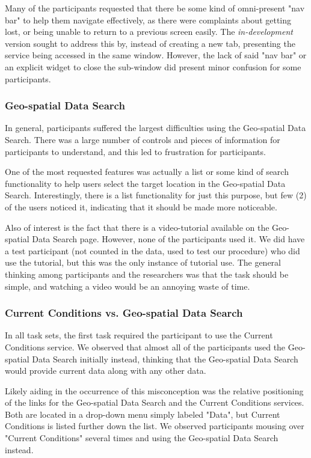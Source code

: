 \documentclass{article}
\begin{document}
Many of the participants requested that there be some kind of omni-present "nav bar" to help them navigate effectively, as there were complaints about getting lost, or being unable to return to a previous screen easily. The \emph{in-development} version sought to address this by, instead of creating a new tab, presenting the service being accessed in the same window. However, the lack of said "nav bar" or an explicit widget to close the sub-window did present minor confusion for some participants.

\subsubsection{Geo-spatial Data Search}
In general, participants suffered the largest difficulties using the Geo-spatial Data Search. There was a large number of controls and pieces of information for participants to understand, and this led to frustration for participants.

One of the most requested features was actually a list or some kind of search functionality to help users select the target location in the Geo-spatial Data Search. Interestingly, there is a list functionality for just this purpose, but few (2) of the users noticed it, indicating that it should be made more noticeable.

Also of interest is the fact that there is a video-tutorial available on the Geo-spatial Data Search page. However, none of the participants used it. We did have a test participant (not counted in the data, used to test our procedure) who did use the tutorial, but this was the only instance of tutorial use. The general thinking among participants and the researchers was that the task should be simple, and watching a video would be an annoying waste of time.

\subsubsection{Current Conditions vs. Geo-spatial Data Search}
In all task sets, the first task required the participant to use the Current Conditions service. We observed that almost all of the participants used the Geo-spatial Data Search initially instead, thinking that the Geo-spatial Data Search would provide current data along with any other data.

Likely aiding in the occurrence of this misconception was the relative positioning of the links for the Geo-spatial Data Search and the Current Conditions services. Both are located in a drop-down menu simply labeled "Data", but Current Conditions is listed further down the list. We observed participants mousing over "Current Conditions" several times and using the Geo-spatial Data Search instead.
\end{document}
